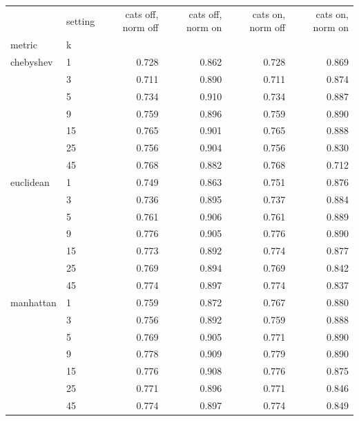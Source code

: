 \begin{tabular}{llrrrr}
\toprule
 & setting & cats off, norm off & cats off, norm on & cats on, norm off & cats on, norm on \\
metric & k &  &  &  &  \\
\midrule
chebyshev & 1 & 0.728 & 0.862 & 0.728 & 0.869 \\
 & 3 & 0.711 & 0.890 & 0.711 & 0.874 \\
 & 5 & 0.734 & 0.910 & 0.734 & 0.887 \\
 & 9 & 0.759 & 0.896 & 0.759 & 0.890 \\
 & 15 & 0.765 & 0.901 & 0.765 & 0.888 \\
 & 25 & 0.756 & 0.904 & 0.756 & 0.830 \\
 & 45 & 0.768 & 0.882 & 0.768 & 0.712 \\
euclidean & 1 & 0.749 & 0.863 & 0.751 & 0.876 \\
 & 3 & 0.736 & 0.895 & 0.737 & 0.884 \\
 & 5 & 0.761 & 0.906 & 0.761 & 0.889 \\
 & 9 & 0.776 & 0.905 & 0.776 & 0.890 \\
 & 15 & 0.773 & 0.892 & 0.774 & 0.877 \\
 & 25 & 0.769 & 0.894 & 0.769 & 0.842 \\
 & 45 & 0.774 & 0.897 & 0.774 & 0.837 \\
manhattan & 1 & 0.759 & 0.872 & 0.767 & 0.880 \\
 & 3 & 0.756 & 0.892 & 0.759 & 0.888 \\
 & 5 & 0.769 & 0.905 & 0.771 & 0.890 \\
 & 9 & 0.778 & 0.909 & 0.779 & 0.890 \\
 & 15 & 0.776 & 0.908 & 0.776 & 0.875 \\
 & 25 & 0.771 & 0.896 & 0.771 & 0.846 \\
 & 45 & 0.774 & 0.897 & 0.774 & 0.849 \\
\bottomrule
\end{tabular}
